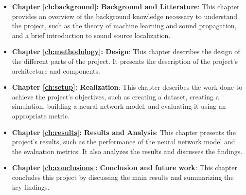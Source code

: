 \begin{itemize}
    \item \textbf{Chapter \ref{ch:background}: Background and Litterature}: This chapter provides an overview of the background knowledge necessary to understand the project, such as the theory of machine learning and sound propagation, and a brief introduction to sound source localization.
    \item \textbf{Chapter \ref{ch:methodology}: Design}: This chapter describes the design of the different parts of the project. It presents the description of the project's architecture and components.
    \item \textbf{Chapter \ref{ch:setup}: Realization}: This chapter describes the work done to achieve the project's objectives, such as creating a dataset, creating a simulation, building a neural network model, and evaluating it using an appropriate metric.
    \item \textbf{Chapter \ref{ch:results}: Results and Analysis}: This chapter presents the project's results, such as the performance of the neural network model and the evaluation metrics. It also analyzes the results and discusses the findings.
    \item \textbf{Chapter \ref{ch:conclusions}: Conclusion and future work}: This chapter concludes this project by discussing the main results and summarizing the key findings. 
\end{itemize}

\section{}
